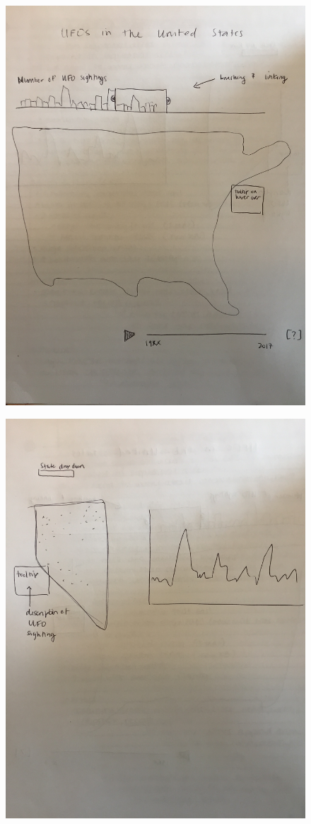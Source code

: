 \documentclass{neu_handout}
\begin{document}
\begin{figure}[h]
\centering
{
\includegraphics[width=0.8\linewidth]{image1}
}
\end{figure}

\begin{figure}[h]
\centering
{
\includegraphics[width=0.8\linewidth]{image2}
}
\end{figure}
\end{document}
